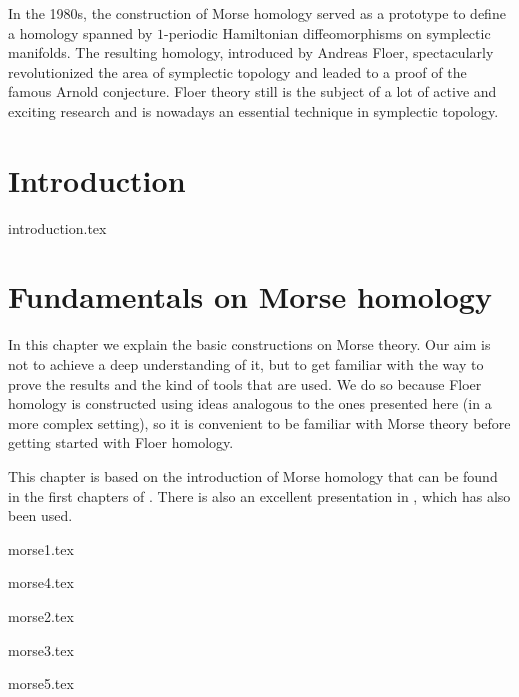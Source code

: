 \documentclass[a4paper,11pt]{book}
\begin{document}
In the 1980s, the construction of Morse homology served as a prototype to define a homology spanned by $1$-periodic Hamiltonian diffeomorphisms on symplectic manifolds. The resulting homology, introduced by Andreas Floer, spectacularly revolutionized the area of symplectic topology and leaded to a proof of the famous Arnold conjecture. Floer theory still is the subject of a lot of active and exciting research and is nowadays an essential technique in symplectic topology.

\tableofcontents

\mainmatter


\chapter*{Introduction}
{introduction.tex}

\chapter{Fundamentals on Morse homology}
In this chapter we explain the basic constructions on Morse theory. Our aim is not to achieve a deep understanding of it, but to get familiar with the way to prove the results and the kind of tools that are used. We do so because Floer homology is constructed using ideas analogous to the ones presented here (in a more complex setting), so it is convenient to be familiar with Morse theory before getting started with Floer homology.

This chapter is based on the introduction of Morse homology that can be found in the first chapters of \cite{audin2014morse}. There is also an excellent presentation in \cite{milnor1963morse}, which has also been used.

{morse1.tex}

 {morse4.tex}

 {morse2.tex}

 {morse3.tex}

 {morse5.tex}
\end{document}
